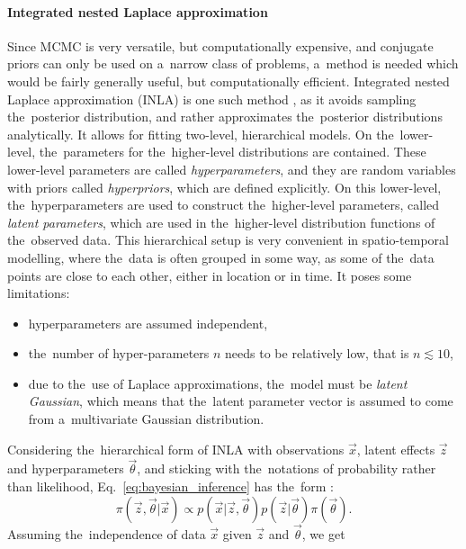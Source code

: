 \paragraph{Integrated nested Laplace approximation}
Since MCMC is very versatile, but computationally expensive, and conjugate priors can only be used on a~narrow class of problems, a~method is needed which would be fairly generally useful, but computationally efficient. Integrated nested Laplace approximation ({INLA}) is one such method \citep{rue2009approximate,martins2013bayesian}, as it avoids sampling the~posterior distribution, and rather approximates the~posterior distributions analytically. It allows for fitting two-level, hierarchical models. On the~lower-level, the~parameters for the~higher-level distributions are contained. These lower-level parameters are called \textit{hyperparameters}, and they are random variables with priors called \textit{hyperpriors}, which are defined explicitly. On this lower-level, the~hyperparameters are used to construct the~higher-level parameters, called \textit{latent parameters}, which are used in the~higher-level distribution functions of the~observed data. This hierarchical setup is very convenient in spatio-temporal modelling, where the~data is often grouped in some way, as some of the~data points are close to each other, either in location or in time. It poses some limitations:
\begin{itemize}
    \item hyperparameters are assumed independent,
    \item the~number of hyper-parameters $n$ needs to be relatively low, that is $n \lesssim 10$,
    \item due to the~use of Laplace approximations, the~model must be \textit{latent Gaussian}, which means that the~latent parameter vector is assumed to come from a~multivariate Gaussian distribution.
\end{itemize}
Considering the~hierarchical form of INLA with observations $\vec{x}$, latent effects $\vec{z}$ and hyperparameters $\vec{\theta}$, and sticking with the~notations of probability rather than likelihood, Eq.~\ref{eq:bayesian_inference} has the~form \citep{gomez2020bayesian}:
\begin{equation}
    \pi(\vec{z}, \vec{\theta}|\vec{x}) \propto p(\vec{x}|\vec{z}, \vec{\theta}) p(\vec{z}|\vec{\theta}) \pi(\vec{\theta}).
    \label{eq:bayesian_hierarchical}
\end{equation}
Assuming the~independence of data $\vec{x}$ given $\vec{z}$ and $\vec{\theta}$, we get

